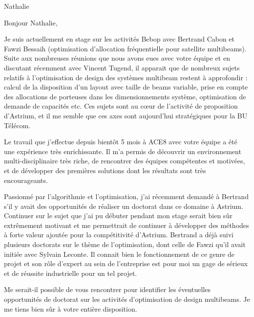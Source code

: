 \documentclass[12pt]{lettre}
\begin{document}
\begin{letter}{Nathalie}
\address{Victor Cameo Ponz\\47 rue Guynemer\\31200 Toulouse}
\nofax

\conc{}
\opening{Bonjour Nathalie,}
Je suis actuellement en stage sur les activités Bebop avec Bertrand Cabon et Fawzi Bessaih
(optimisation d’allocation fréquentielle pour satellite multibeams).
Suite aux nombreuses réunions que nous avons eues avec votre équipe et en
discutant récemment avec Vincent Tugend,
il apparait que de nombreux sujets relatifs à l’optimisation de design des systèmes
multibeam restent à approfondir : calcul de la disposition d’un layout avec taille de beams variable,
prise en compte des allocations de porteuses dans les dimensionnements système,
optimisation de demande de capacités etc.
Ces sujets sont au cœur de l’activité de proposition d’Astrium,
et il me semble que ces axes sont aujourd’hui stratégiques pour la BU Télécom.

Le travail que j’effectue depuis bientôt 5 mois à ACE8 avec votre équipe a été une expérience très enrichissante. Il m’a permis de découvrir un environnement multi-disciplinaire très riche, de rencontrer des équipes compétentes et motivées, et de développer des premières solutions dont les résultats sont très encourageants.

Passionné par l’algorithmie et l’optimisation, j’ai récemment demandé à Bertrand s’il y avait des opportunités de réaliser un doctorat dans ce domaine à Astrium. Continuer sur le sujet que j’ai pu débuter pendant mon stage serait bien sûr extrêmement motivant et me permettrait de continuer à développer des méthodes à forte valeur ajoutée pour la compétitivité d’Astrium. Bertrand a déjà suivi plusieurs doctorats sur le thème de l’optimisation, dont celle de Fawzi qu’il avait initiée avec Sylvain Leconte. Il connait bien le fonctionnement de ce genre de projet et son rôle d’expert au sein de l’entreprise est pour moi un gage de sérieux et de réussite industrielle pour un tel projet.

Me serait-il possible de vous rencontrer pour identifier les éventuelles opportunités de doctorat sur les activités d’optimisation de design multibeams. Je me tiens bien sûr à votre entière disposition.

\closing{}
\end{letter}
\end{document}

